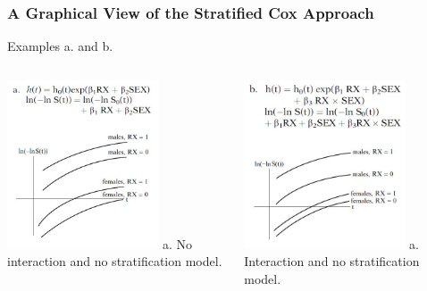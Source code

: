 \documentclass{beamer}
\theoremstyle{definition}
\begin{document}
\begin{frame}
\frametitle{A Graphical View of the Stratified Cox Approach}
\begin{block}{Examples a. and b.}
\begin{columns}
    \begin{column}{0.48\textwidth}
        \includegraphics[width =\textwidth, height=5cm]{CH5_G1.JPG}
        a. No interaction and no stratification model.
    \end{column}
    \hspace{-10pt}
    \begin{column}{0.48\textwidth}
         \includegraphics[width =\textwidth, height=5cm]{CH5_G2.JPG}
         a. Interaction and no stratification model.
    \end{column}
\end{columns}
\end{block}
\end{frame}
\end{document}
